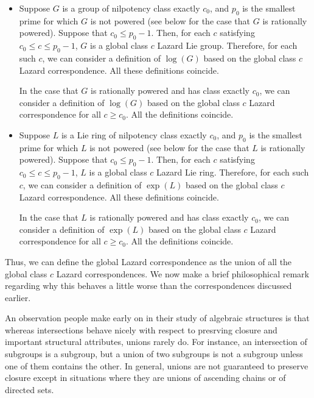 \begin{itemize}
\item Suppose $G$ is a group of nilpotency class exactly $c_0$, and
  $p_0$ is the smallest prime for which $G$ is not powered (see below
  for the case that $G$ is rationally powered). Suppose that $c_0 \le
  p_0 - 1$. Then, for each $c$ satisfying $c_0 \le c \le p_0 - 1$, $G$
  is a global class $c$ Lazard Lie group. Therefore, for each such
  $c$, we can consider a definition of $\log(G)$ based on the global
  class $c$ Lazard correspondence. All these definitions coincide.

  In the case that $G$ is rationally powered and has class exactly
  $c_0$, we can consider a definition of $\log(G)$ based on the global
  class $c$ Lazard correspondence for all $c \ge c_0$. All the
  definitions coincide.
\item Suppose $L$ is a Lie ring of nilpotency class exactly $c_0$, and
  $p_0$ is the smallest prime for which $L$ is not powered (see below
  for the case that $L$ is rationally powered). Suppose that $c_0 \le
  p_0 - 1$. Then, for each $c$ satisfying $c_0 \le c \le p_0 - 1$, $L$
  is a global class $c$ Lazard Lie ring. Therefore, for each such $c$,
  we can consider a definition of $\exp(L)$ based on the global class
  $c$ Lazard correspondence. All these definitions coincide.

  In the case that $L$ is rationally powered and has class exactly
  $c_0$, we can consider a definition of $\exp(L)$ based on the global
  class $c$ Lazard correspondence for all $c \ge c_0$. All the
  definitions coincide.
\end{itemize}

Thus, we can define the global Lazard correspondence as the union of
all the global class $c$ Lazard correspondences. We now make a brief
philosophical remark regarding why this behaves a little worse than
the correspondences discussed earlier.

An observation people make early on in their study of algebraic
structures is that whereas intersections behave nicely with respect to
presrving closure and important structural attributes, unions rarely
do. For instance, an intersection of subgroups is a subgroup, but a
union of two subgroups is not a subgroup unless one of them contains
the other. In general, unions are not guaranteed to preserve closure
except in situations where they are unions of ascending chains or of
directed sets.

